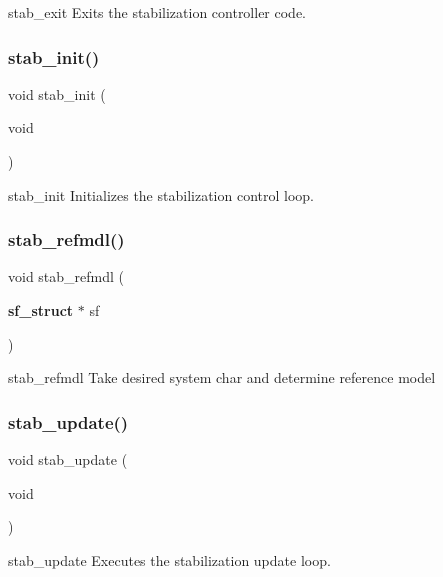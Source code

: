 stab\+\_\+exit Exits the stabilization controller code. \mbox{\label{stab_8c_afebd7080cdd60d2bd10a3b841458a738}} 
\subsubsection{stab\+\_\+init()}
{\footnotesize\ttfamily void stab\+\_\+init (\begin{DoxyParamCaption}\item[{void}]{ }\end{DoxyParamCaption})}

stab\+\_\+init Initializes the stabilization control loop. \mbox{\label{stab_8c_a990546b623a6709713ebe3186da90d3e}} 
\subsubsection{stab\+\_\+refmdl()}
{\footnotesize\ttfamily void stab\+\_\+refmdl (\begin{DoxyParamCaption}\item[{\textbf{ sf\+\_\+struct} $\ast$}]{sf }\end{DoxyParamCaption})}

stab\+\_\+refmdl Take desired system char and determine reference model \mbox{\label{stab_8c_a5ca4701cc9747034af33ba50ffb2bb81}} 
\subsubsection{stab\+\_\+update()}
{\footnotesize\ttfamily void stab\+\_\+update (\begin{DoxyParamCaption}\item[{void}]{ }\end{DoxyParamCaption})}

stab\+\_\+update Executes the stabilization update loop. 